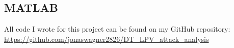 \documentclass[]{article}
\begin{document}
\subsection{MATLAB}\label{apx:MATLAB}
All code I wrote for this project can be found on my GitHub repository:\\
\href{https://github.com/jonaswagner2826/DT_LPV_attack_analysis}{https://github.com/jonaswagner2826/DT\_LPV\_attack\_analysis}\\
%
%
%
%
\end{document}
